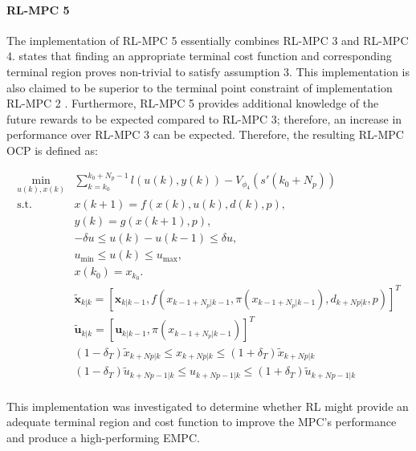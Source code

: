 \paragraph{RL-MPC 5}
The implementation of RL-MPC 5 essentially combines RL-MPC 3 and RL-MPC 4. \citet{amritEconomicOptimizationUsing2011} states that finding an appropriate terminal cost function and corresponding terminal region proves non-trivial  to satisfy assumption 3. This implementation is also claimed to be superior to the terminal point constraint of implementation RL-MPC 2 \cite{amritEconomicOptimizationUsing2011}. Furthermore, RL-MPC 5 provides additional knowledge of the future rewards to be expected compared to RL-MPC 3; therefore, an increase in performance over RL-MPC 3 can be expected. Therefore, the resulting RL-MPC OCP is defined as:

\begin{subequations} \label{eq:rl-mpc-ocp}
	\begin{align}
		\min_{u(k),x(k)} & \sum_{k = k_0}^{k_0 + N_p-1} {l(u(k), y(k))} - V_{\phi_4}(s'(k_0+N_p)) \\
		\text{s.t.} \quad & x(k+1) = f(x(k), u(k), d(k), p),  \label{eq:rl-mpc-dynamics-constraint} \\
		& y(k) = g(x(k+1), p), \label{eq:rl-mpc-output-constraint} \\
		& -\delta u \leq u(k) - u(k-1) \leq \delta u, \label{eq:rl-mpc-delta-u} \\
		& u_{\min} \leq u(k) \leq u_{\max}, \label{eq:rl-mpc-u-limits}\\
		& x(k_0) = x_{k_0}. \label{eq:rl-pmc-initial} \\
 		&\tilde{\mathbf{x}}_{k|k} = [\mathbf{x}_{k|k-1},f(x_{k-1 + N_p|k-1}, \pi(x_{k-1 + N_p|k-1}), d_{k+Np|k},p)]^T\\ 
		&\tilde{\mathbf{u}}_{k|k} = [\mathbf{u}_{k|k-1},\pi(x_{k-1 + N_p|k-1})]^T\\
		& (1-\delta_T)\tilde{x}_{k+Np|k} \leq x_{k+Np|k} \leq (1+\delta_T)\tilde{x}_{k+Np|k}\\
		&(1-\delta_T)\tilde{u}_{k+Np-1|k} \leq u_{k+Np-1|k} \leq (1+\delta_T) \tilde{u}_{k+Np-1|k}\\
	\end{align}
\end{subequations}

This implementation was investigated to determine whether RL might provide an adequate terminal region and cost function to improve the MPC's performance and produce a high-performing EMPC. 


